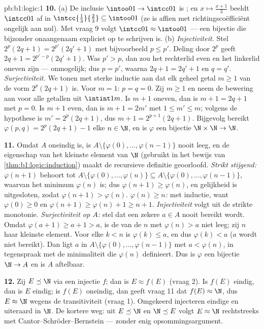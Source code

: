 \begin{solution}{pb:b1:logic:1}
\textbf{10.} (a) De inclusie $\intoo01 \to \intcc01$ is ; en $x
\mapsto \frac{x + 1}3$ beeldt $\intcc01$  af in
$\intcc{\frac13}{\frac23} \subseteq \intoo01$ (ze is affien met
richtingscoëfficiënt ongelijk aan nul). Met vraag 9 volgt $\intcc01
\approx \intoo01$ --- een bijectie die bijzonder onaangenaam expliciet op
te schrijven is. (b) \emph{Injectiviteit.} Stel $2^p(2q + 1) =
2^{p'}(2q' + 1)$ met bijvoorbeeld $p \leq p'$. Deling door $2^p$ geeft
$2q + 1 = 2^{p' - p}(2q' + 1)$. Was $p' > p$, dan zou het rechterlid even
en het linkerlid oneven zijn --- onmogelijk; dus $p = p'$, waarna $2q + 1
= 2q' + 1$ en $q = q'$. \emph{Surjectiviteit.} We tonen met sterke
inductie aan dat elk geheel getal $m \geq 1$ van de vorm $2^p(2q + 1)$
is. Voor $m = 1$: $p = q = 0$. Zij $m \geq 1$ en neem de bewering aan
voor alle getallen uit $\intint1m$. Is $m + 1$ oneven, dan is $m + 1 =
2q + 1$ met $p = 0$. Is $m + 1$ even, dan is $m + 1 = 2m'$ met $1 \leq m'
\leq m$; volgens de hypothese is $m' = 2^p(2q + 1)$, dus $m + 1 =
2^{p+1}(2q + 1)$. Bijgevolg bereikt $\varphi(p, q) = 2^p(2q + 1) - 1$
elke $n \in \N$, en is $\varphi$ een bijectie $\N \times \N \to \N$.

\textbf{11.} Omdat $A$ oneindig is, is $A \setminus \{\varphi(0), \dots,
\varphi(n - 1)\}$ nooit leeg, en de eigenschap van het kleinste element
van $\N$ (gebruikt in het bewijs van \cref{thm:b1:logic:induction}) maakt
de recursieve definitie geoorloofd. \emph{Strikt stijgend:} $\varphi(n +
1)$ behoort tot $A \setminus \{\varphi(0), \dots, \varphi(n)\} \subseteq
A \setminus \{\varphi(0), \dots, \varphi(n - 1)\}$, waarvan het minimum
$\varphi(n)$ is; dus $\varphi(n + 1) \geq \varphi(n)$, en gelijkheid is
uitgesloten, zodat $\varphi(n+1) > \varphi(n)$. \emph{$\varphi(n) \geq
n$:} met inductie, want $\varphi(0) \geq 0$ en $\varphi(n + 1) \geq
\varphi(n) + 1 \geq n + 1$. \emph{Injectiviteit} volgt uit de strikte
monotonie. \emph{Surjectiviteit op $A$:} stel dat een zekere $a \in A$
nooit bereikt wordt. Omdat $\varphi(a + 1) \geq a + 1 > a$, is de
 van de $n$ met $\varphi(n) > a$ niet leeg; zij $n$ haar
kleinste element. Voor elke $k < n$ is $\varphi(k) \leq a$, en dus
$\varphi(k) < a$ ($a$ wordt niet bereikt). Dan ligt $a$ in $A \setminus
\{\varphi(0), \dots, \varphi(n - 1)\}$ met $a < \varphi(n)$, in
tegenspraak met de minimaliteit die $\varphi(n)$ definieert. Dus is
$\varphi$ een bijectie $\N \to A$ en is $A$ aftelbaar.

\textbf{12.} Zij $E \preceq \N$ via een injectie $f$; dan is $E \approx
f(E)$ (vraag 2). Is $f(E)$ eindig, dan is $E$ eindig; is $f(E)$ oneindig,
dan geeft vraag 11 dat $f(E) \approx \N$, dus $E \approx \N$ wegens de
transitiviteit (vraag 1). Omgekeerd injecteren eindige en  uiteraard in $\N$. De kortere weg: uit $E \preceq \N$ en
$\N \preceq E$ volgt $E \approx \N$ rechtstreeks met
Cantor--Schröder--Bernstein --- zonder enig opsommingsargument.


\end{solution}
